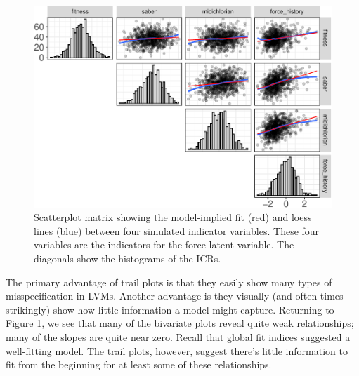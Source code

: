 \documentclass[
  english,
  man]{apa6}
\begin{document}
\begin{figure}

{\centering \includegraphics[width=0.9\linewidth]{flexplavaan_draft_files/figure-latex/trailMatrix-1} 

}

\caption{Scatterplot matrix showing the model-implied fit (red) and loess lines (blue) between four simulated indicator variables. These four variables are the indicators for the force latent variable. The diagonals show the histograms of the ICRs.}\label{fig:trailMatrix}
\end{figure}

The primary advantage of trail plots is that they easily show many types of misspecification in LVMs. Another advantage is they visually (and often times strikingly) show how little information a model might capture. Returning to Figure \ref{fig:trailMatrix}, we see that many of the bivariate plots reveal quite weak relationships; many of the slopes are quite near zero. Recall that global fit indices suggested a well-fitting model. The trail plots, however, suggest there's little information to fit from the beginning for at least some of these relationships.
\end{document}
